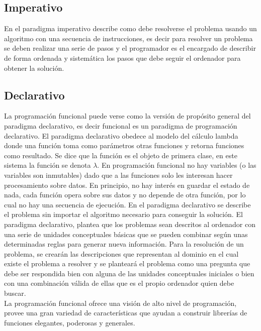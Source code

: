 \subsection{Imperativo}

En el paradigma imperativo describe como debe resolverse el problema usando un algoritmo con una secuencia de instrucciones, es decir para resolver un problema se deben realizar una serie de pasos y el programador es el encargado de describir de forma ordenada y sistemática los pasos que debe seguir el ordenador para obtener la solución.

\subsection{Declarativo}

La programación funcional puede verse como la versión de propósito general del paradigma declarativo, es decir funcional es un paradigma de programación declarativo.
El paradigma declarativo obedece al modelo del cálculo lambda donde una función toma como parámetros otras funciones y retorna funciones como resultado. Se dice que la función es el objeto de primera clase, en este sistema la función se denota $\lambda$.
En programación funcional no hay variables (o las variables son inmutables) dado que a las funciones solo les interesan hacer procesamiento sobre datos. En principio, no hay interés en guardar el estado de nada, cada función opera sobre sus datos y no depende de otra función, por lo cual no hay una secuencia de ejecución.
En el paradigma declarativo se describe el problema sin importar el algoritmo necesario para conseguir la solución.
El paradigma declarativo, plantea que los problemas sean descritos al ordenador con una serie de unidades conceptuales básicas que se pueden combinar según unas determinadas
reglas para generar nueva información. Para la resolución de un problema, se crearán las
descripciones que representan al dominio en el cual existe el problema a resolver y se planteará el problema como una pregunta que debe ser respondida bien con alguna de las unidades conceptuales iniciales o bien con una combinación válida de ellas que es el propio ordenador quien debe buscar.
\\
La programación funcional ofrece una visión de alto nivel de programación, provee una gran variedad de características que ayudan a construir librerías de funciones elegantes, poderosas y generales.\cite{Thompson2011}


